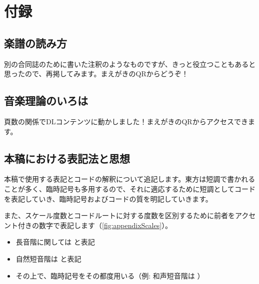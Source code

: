 \documentclass[10pt,b5paper, twocolumn]{ltjsarticle}
\begin{document}
\section{付録}
\setcounter{figure}{0}
\renewcommand{\thefigure}{\roman{figure}}
\renewcommand{\thetable}{\roman{table}}
\subsection{楽譜の読み方}
別の合同誌のために書いた注釈のようなものですが、きっと役立つこともあると思ったので、再掲してみます。まえがきのQRからどうぞ！
\subsection{音楽理論のいろは}
頁数の関係でDLコンテンツに動かしました！まえがきのQRからアクセスできます。
\subsection{本稿における表記法と思想}
本稿で使用する表記とコードの解釈について追記します。東方は短調で書かれることが多く、臨時記号も多用するので、それに適応するために短調としてコードを表記していき、臨時記号およびコードの質を明記していきます。\par
また、スケール度数とコードルートに対する度数を区別するために前者をアクセント付きの数字で表記します（\autoref{fig:appendixScales}）。\par
\begin{itemize}
    \item  長音階に関しては        と表記
    \item 自然短音階は   \fl {}   \fl {} \fl {} と表記
    \item その上で、臨時記号をその都度用いる（例: 和声短音階は   \fl {}   \fl {} \na {} ）
\end{itemize}
\end{document}

